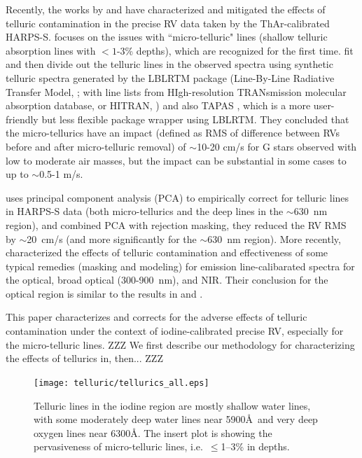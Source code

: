 Recently, the works by \cite{artigau2014} and \cite{cunha2014} have
characterized and mitigated the effects of telluric contamination in
the precise RV data taken by the ThAr-calibrated HARPS-S.
\cite{cunha2014} focuses on the issues with ``micro-telluric" lines
(shallow telluric absorption lines with $<1$-3\% depths), which are
recognized for the first time. \cite{cunha2014} fit and then divide
out the telluric lines in the observed spectra using synthetic
telluric spectra generated by the LBLRTM package (Line-By-Line
Radiative Transfer Model, \citealt{lblrtm}; with line lists from
HIgh-resolution TRANsmission molecular absorption database, or HITRAN,
\citealt{hitran2013}) and also TAPAS \citep{tapas}, which is a more
user-friendly but less flexible package wrapper using LBLRTM. They
concluded that the micro-tellurics have an impact (defined as RMS of
difference between RVs before and after micro-telluric removal) of
$\sim$10-20 cm/s for G stars observed with low to moderate air masses,
but the impact can be substantial in some cases to up to $\sim$0.5-1
m/s.

\cite{artigau2014} uses principal component analysis (PCA) to
empirically correct for telluric lines in HARPS-S data (both
micro-tellurics and the deep lines in the $\sim$630~nm region), and
combined PCA with rejection masking, they reduced the RV RMS by
$\sim$20~cm/s (and more significantly for the $\sim$630~nm
region). More recently, \cite{2016AAS...22713719S} characterized the
effects of telluric contamination and effectiveness of some typical
remedies (masking and modeling) for emission line-calibarated spectra
for the optical, broad optical (300-900~nm), and NIR. Their conclusion
for the optical region is similar to the results in \cite{artigau2014}
and \cite{cunha2014}.

This paper characterizes and corrects for the adverse effects of
telluric contamination under the context of iodine-calibrated precise
RV, especially for the micro-telluric lines. ZZZ We first describe our
methodology for characterizing the effects of tellurics in, then... ZZZ


\begin{figure}
\texttt{[image: telluric/tellurics\_all.eps]} 
\caption{Telluric lines in the iodine region are mostly shallow water
lines, with some moderately deep water lines near 5900\AA\ and very
deep oxygen lines near 6300\AA. The insert plot is showing the
pervasiveness of micro-telluric lines, i.e.~$\leq$1--3\% in depths.
\label{fig:telluric}}
\end{figure}



